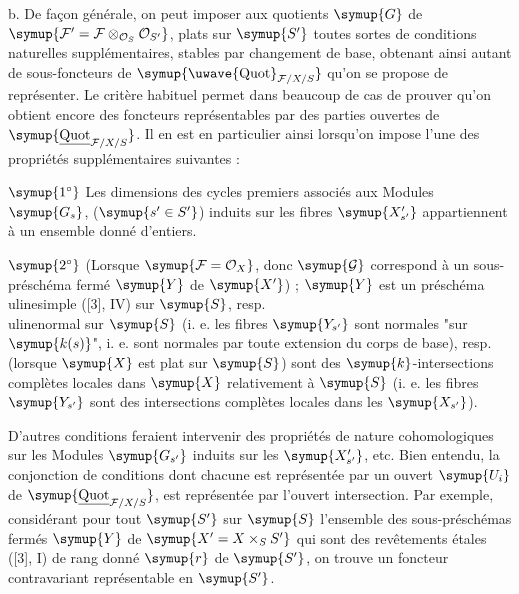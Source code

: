 \medskip
\noindent b. De façon générale, on peut imposer aux quotients $\symup{G}$ de
$\symup{\mathcal F'=\mathcal F\otimes_{\mathcal O_S}\mathcal O_{S'}}$, plats sur $\symup{S'}$
toutes sortes de conditions naturelles supplémentaires, stables par changement
de base, obtenant ainsi autant de sous-foncteurs de
$\symup{\mathop{\text{\uwave{Quot}}}\nolimits_{\mathcal F/X/S}}$ qu'on se propose de
représenter. Le critère habituel permet dans beaucoup de cas de prouver qu'on
obtient encore des foncteurs représentables par des parties ouvertes de
$\symup{\underline{\operatorname{Quot}}_{\mathcal F/X/S}}$. Il en est en particulier ainsi
lorsqu'on impose l'une des propriétés supplémentaires suivantes :

\smallskip
\noindent $\symup{1^\circ}$ Les dimensions des cycles premiers associés aux Modules
$\symup{G_s}$, ($\symup{s'\in S'}$) induits sur les fibres $\symup{X'_{s'}}$ appartiennent
à un ensemble donné d'entiers.

\smallskip
\noindent $\symup{2^\circ}$ (Lorsque $\symup{\mathcal F=\mathcal O_X}$, donc $\symup{\mathcal G}$
correspond à un sous-préschéma fermé $\symup{Y}$ de $\symup{X'}$) ; $\symup{Y}$ est un préschéma \\uline{simple}
([3], IV) sur $\symup{S}$, resp. \\uline{normal} sur $\symup{S}$ (i. e. les fibres $\symup{Y_{s'}}$ sont normales
"sur $\symup{k(s)}$", i. e. sont normales par toute extension du corps de base),
resp. (lorsque $\symup{X}$ est plat sur $\symup{S}$) sont des $\symup{k}$-intersections complètes
locales dans $\symup{X}$ relativement à $\symup{S}$ (i. e. les fibres $\symup{Y_{s'}}$ sont des
intersections complètes locales dans les $\symup{X_{s'}}$).

D'autres conditions feraient intervenir des propriétés de nature
cohomologiques sur les Modules $\symup{G_{s'}}$ induits sur les $\symup{X'_{s'}}$,
etc. Bien entendu, la conjonction de conditions dont chacune est représentée
par un ouvert $\symup{U_i}$ de $\symup{\underline{\operatorname{Quot}}_{\mathcal F/X/S}}$, est représentée
par l'ouvert intersection. Par exemple, considérant pour tout $\symup{S'}$ sur $\symup{S}$
l'ensemble des sous-préschémas fermés $\symup{Y}$ de $\symup{X'=X\times_SS'}$ qui sont des
revêtements étales ([3], I) de rang donné $\symup{r}$ de $\symup{S'}$, on trouve un foncteur
contravariant représentable en $\symup{S'}$.

